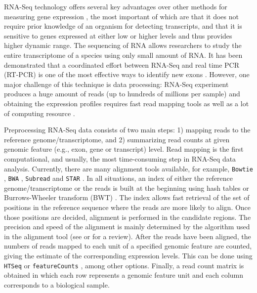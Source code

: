 RNA-Seq technology offers several key advantages over other methods for measuring gene expression 
\citep{wang2009rna}, the most
important of which are that it does not require prior knowledge of an organism for detecting
transcripts,  and that it is sensitive to genes expressed at either low or higher levels and thus
provides higher dynamic range. The sequencing of RNA allows researchers to study the entire
transcriptome of a species using only small amount of RNA. It has been demonstrated that a
coordinated effort between RNA-Seq and real time PCR (RT-PCR) is one of the most effective ways to
identify new exons \citep{howald2012combining}. However, one major challenge of this technique is
data processing: RNA-Seq experiment produces a huge amount of reads (up to hundreds of
millions per sample) and obtaining the expression profiles requires fast read mapping tools as well
as a lot of computing resource \citep{langmead2009ultrafast,li2010fast}.



Preprocessing RNA-Seq data consists of two main steps: 1) mapping reads to the reference
genome/transcriptome, and 2) summarizing read counts at given genomic feature (e.g., exon, gene or
transcript) level. Read mapping is the first computational, and usually, the most time-consuming
step in RNA-Seq data analysis. Currently, there are many alignment tools available, for example,
\verb|Bowtie| \citep{langmead2012fast,langmead2009ultrafast}, \verb|BWA| 
\citep{li2013aligning,li2009fast},
\verb|Subread| \citep{shi2013subread} and \verb|STAR| \citep{dobin2013star}. In all situations, an 
index of either
the reference genome/transcriptome or the reads is built at the beginning using hash tables or 
Burrows-Wheeler
transform (BWT) \citep{burrows1994block}. The index allows fast retrieval of the set of positions in
the reference sequence where the reads are more likely to align. Once those positions are decided,
alignment is performed in the candidate regions. The precision and speed of the alignment is mainly
determined by the algorithm used in the alignment tool (see \citep{hatem2013benchmarking} or
\cite{li2010survey} for a review). After the reads have been aligned, the numbers of reads mapped to
each unit of a specified genomic feature are counted, giving the estimate of the corresponding
expression levels. This can be done using \verb|HTSeq| \cite{anders2010htseq} or 
\verb|featureCounts| 
\citep{liao2013featurecounts}, among other options. Finally, a read count matrix is
obtained in which each row represents a genomic feature unit and each column corresponds to a 
biological
sample. 

